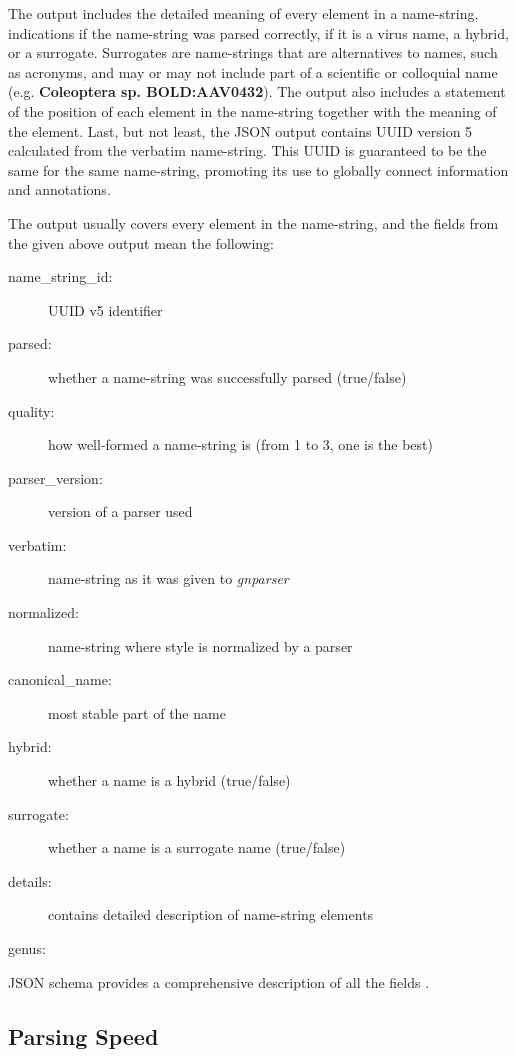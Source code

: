 \documentclass{bmcart}
\begin{document}
The output includes the detailed meaning of every element in a name-string,
indications if the name-string was parsed correctly, if it is a virus name, a
hybrid, or a surrogate. Surrogates are name-strings that are alternatives to
names, such as acronyms, and may or may not include part of a scientific or
colloquial name (e.g. \textbf{Coleoptera sp. BOLD:AAV0432}). The output also
includes a statement of the position of each element in the name-string
together with the meaning of the element.  Last, but not least, the JSON output
contains UUID version 5 calculated from the verbatim name-string. This UUID is
guaranteed to be the same for the same name-string, promoting its use to
globally connect information and annotations.

The output usually covers every element in the name-string, and the fields from
the given above output mean the following:

\begin{description}

  \item[name\_string\_id:] UUID v5 identifier
  \item[parsed:] whether a name-string was successfully parsed (true/false)
  \item[quality:] how well-formed a name-string is (from 1 to 3, one is the
    best)
  \item[parser\_version:] version of a parser used
  \item[verbatim:] name-string as it was given to \textit{gnparser}
  \item[normalized:] name-string where style is normalized by a parser
  \item[canonical\_name:] most stable part of the name
  \item[hybrid:] whether a name is a hybrid (true/false)
  \item[surrogate:] whether a name is a surrogate name (true/false)
  \item[details:] contains detailed description of name-string elements
  \item[genus:]

\end{description}

JSON schema provides a comprehensive description of all the fields
\cite{gnparser-json}.

\subsection*{Parsing Speed}
\end{document}
